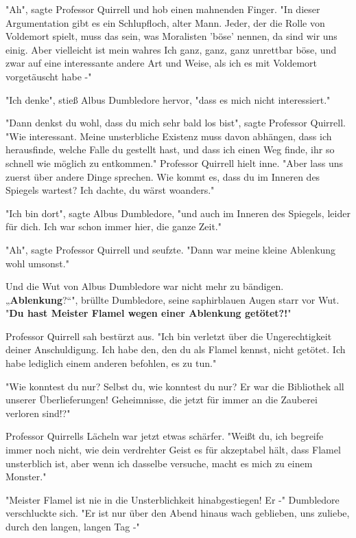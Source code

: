 {"Ah", sagte Professor Quirrell und hob einen mahnenden Finger. "In dieser Argumentation gibt es ein Schlupfloch, alter Mann. Jeder, der die Rolle von Voldemort spielt, muss das sein, was Moralisten 'böse' nennen, da sind wir uns einig. Aber vielleicht ist mein wahres Ich ganz, ganz, ganz unrettbar böse, und zwar auf eine interessante andere Art und Weise, als ich es mit Voldemort vorgetäuscht habe -"

"Ich denke", stieß Albus Dumbledore hervor, "dass es mich nicht interessiert."

"Dann denkst du wohl, dass du mich sehr bald los bist", sagte Professor Quirrell. "Wie interessant. Meine unsterbliche Existenz muss davon abhängen, dass ich herausfinde, welche Falle du gestellt hast, und dass ich einen Weg finde, ihr so schnell wie möglich zu entkommen." Professor Quirrell hielt inne. "Aber lass uns zuerst über andere Dinge sprechen. Wie kommt es, dass du im Inneren des Spiegels wartest? Ich dachte, du wärst woanders."

"Ich bin dort", sagte Albus Dumbledore, "und auch im Inneren des Spiegels, leider für dich. Ich war schon immer hier, die ganze Zeit."

"Ah", sagte Professor Quirrell und seufzte. "Dann war meine kleine Ablenkung wohl umsonst."

Und die Wut von Albus Dumbledore war nicht mehr zu bändigen.\\ „\textbf{Ablenkung}?“", brüllte Dumbledore, seine saphirblauen Augen starr vor Wut. "\textbf{Du hast Meister Flamel wegen einer Ablenkung getötet?!}"

Professor Quirrell sah bestürzt aus. "Ich bin verletzt über die Ungerechtigkeit deiner Anschuldigung. Ich habe den, den du als Flamel kennst, nicht getötet. Ich habe lediglich einem anderen befohlen, es zu tun."

"Wie konntest du nur? Selbst du, wie konntest du nur? Er war die Bibliothek all unserer Überlieferungen! Geheimnisse, die jetzt für immer an die Zauberei verloren sind!?"

Professor Quirrells Lächeln war jetzt etwas schärfer. "Weißt du, ich begreife immer noch nicht, wie dein verdrehter Geist es für akzeptabel hält, dass Flamel unsterblich ist, aber wenn ich dasselbe versuche, macht es mich zu einem Monster."

"Meister Flamel ist nie in die Unsterblichkeit hinabgestiegen! Er -" Dumbledore verschluckte sich. "Er ist nur über den Abend hinaus wach geblieben, uns zuliebe, durch den langen, langen Tag -"

}
